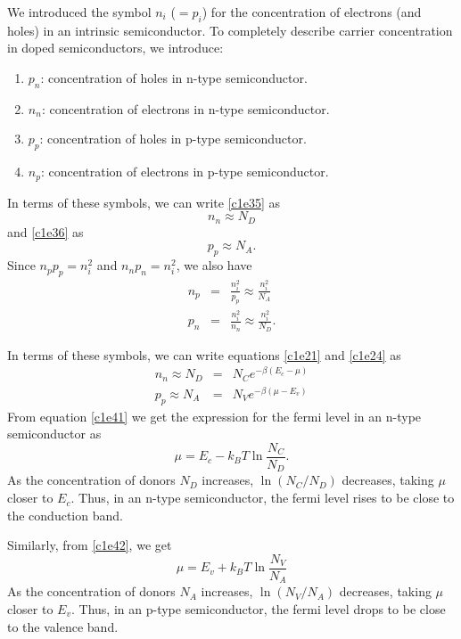 We introduced the symbol $n_i$ ($= p_i$) for the concentration of electrons 
(and holes) in an intrinsic semiconductor. To completely describe carrier 
concentration in doped semiconductors, we introduce:
\begin{enumerate}
\item $p_n$: concentration of holes in n-type semiconductor.
\item $n_n$: concentration of electrons in n-type semiconductor.
\item $p_p$: concentration of holes in p-type semiconductor.
\item $n_p$: concentration of electrons in p-type semiconductor.
\end{enumerate}
In terms of these symbols, we can write \eqref{c1e35} as
\begin{equation}\label{c1e37}
n_n \approx N_D
\end{equation}
and \eqref{c1e36} as
\begin{equation}\label{c1e38}
p_p \approx N_A.
\end{equation}
Since $n_pp_p = n_i^2$ and $n_np_n = n_i^2$, we also have
\begin{eqnarray}
n_p &=& \frac{n_i^2}{p_p} \approx \frac{n_i^2}{N_A}  \label{c1e39} \\
p_n &=& \frac{n_i^2}{n_n} \approx \frac{n_i^2}{N_D}. \label{c1e40}
\end{eqnarray}

In terms of these symbols, we can write equations \eqref{c1e21} and 
\eqref{c1e24} as
\begin{eqnarray}
n_n \approx N_D &=& N_C e^{-\beta(E_c - \mu)} \label{c1e41} \\
p_p \approx N_A &=& N_V e^{-\beta(\mu - E_v)} \label{c1e42}
\end{eqnarray}
From equation \eqref{c1e41} we get the expression for the fermi level in an
n-type semiconductor as
\begin{equation}\label{c1e43}
\mu = E_c - k_BT\ln\frac{N_C}{N_D}.
\end{equation}
As the concentration of donors $N_D$ increases, $\ln(N_C/N_D)$ decreases,
taking $\mu$ closer to $E_c$. Thus, in an n-type semiconductor, the fermi level 
rises to be close to the conduction band.

Similarly, from \eqref{c1e42}, we get
\begin{equation}\label{c1e44}
\mu = E_v + k_BT\ln\frac{N_V}{N_A}
\end{equation}
As the concentration of donors $N_A$ increases, $\ln(N_V/N_A)$ decreases,
taking $\mu$ closer to $E_v$. Thus, in an p-type semiconductor, the fermi level 
drops to be close to the valence band.


